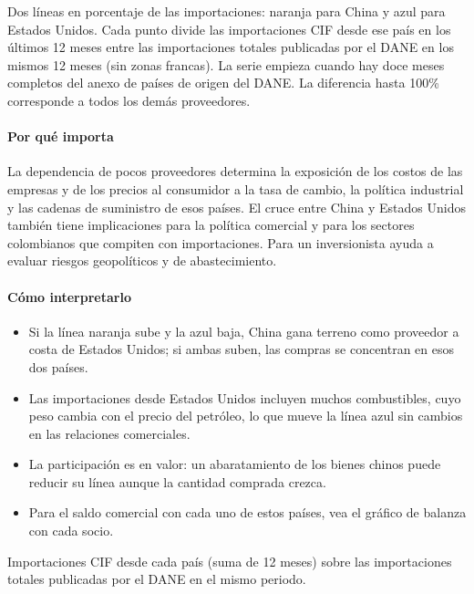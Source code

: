 \begin{leer}
Dos líneas en porcentaje de las importaciones: naranja para China y azul para Estados Unidos. Cada punto divide las importaciones CIF desde ese país en los últimos 12 meses entre las importaciones totales publicadas por el DANE en los mismos 12 meses (sin zonas francas). La serie empieza cuando hay doce meses completos del anexo de países de origen del DANE. La diferencia hasta 100\% corresponde a todos los demás proveedores.
\end{leer}

\paragraph{Por qué importa}
La dependencia de pocos proveedores determina la exposición de los costos de las empresas y de los precios al consumidor a la tasa de cambio, la política industrial y las cadenas de suministro de esos países. El cruce entre China y Estados Unidos también tiene implicaciones para la política comercial y para los sectores colombianos que compiten con importaciones. Para un inversionista ayuda a evaluar riesgos geopolíticos y de abastecimiento.

\paragraph{Cómo interpretarlo}
\begin{itemize}
\item Si la línea naranja sube y la azul baja, China gana terreno como proveedor a costa de Estados Unidos; si ambas suben, las compras se concentran en esos dos países.
\item Las importaciones desde Estados Unidos incluyen muchos combustibles, cuyo peso cambia con el precio del petróleo, lo que mueve la línea azul sin cambios en las relaciones comerciales.
\item La participación es en valor: un abaratamiento de los bienes chinos puede reducir su línea aunque la cantidad comprada crezca.
\item Para el saldo comercial con cada uno de estos países, vea el gráfico de balanza con cada socio.
\end{itemize}
\begin{formulas}[Fórmulas]
\end{formulas}
\begin{metodo}[Metodología]
Importaciones CIF desde cada país (suma de 12 meses) sobre las importaciones totales publicadas por el DANE en el mismo periodo.
\par{}
\end{metodo}

